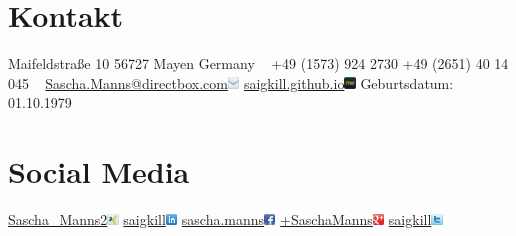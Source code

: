 \documentclass[a4paper,latin]{friggeri-cv} %
\begin{document}
%



\begin{aside} %
\section{Kontakt}
Maifeldstraße 10
56727 Mayen
Germany
~
+49 (1573) 924 2730
+49 (2651) 40 14 045
~
\href{mailto:Sascha.Manns@directbox.com}{Sascha.Manns@directbox.com}\includegraphics[width=0.3cm]{../Pictures/email.png}
\href{http://saigkill.github.io}{saigkill.github.io}\includegraphics[width=0.3cm]{../Pictures/aboutme.png}
Geburtsdatum: 01.10.1979
\section{Social Media}
\href{https://www.xing.com/profile/Sascha\_Manns2}{Sascha\_Manns2}\includegraphics[width=0.3cm]{../Pictures/xing.png}
\href{https://www.linkedin.com/in/saigkill}{saigkill}\includegraphics[width=0.3cm]{../Pictures/linkedin.png}
\href{https://www.facebook.com/sascha.manns}{sascha.manns}\includegraphics[width=0.3cm]{../Pictures/facebook.png}
\href{https://plus.google.com/+SaschaManns}{+SaschaManns}\includegraphics[width=0.3cm]{../Pictures/google-plus.png}
\href{https://twitter.com/saigkill}{saigkill}\includegraphics[width=0.3cm]{../Pictures/twitter.png}

\end{aside}
\end{document}
